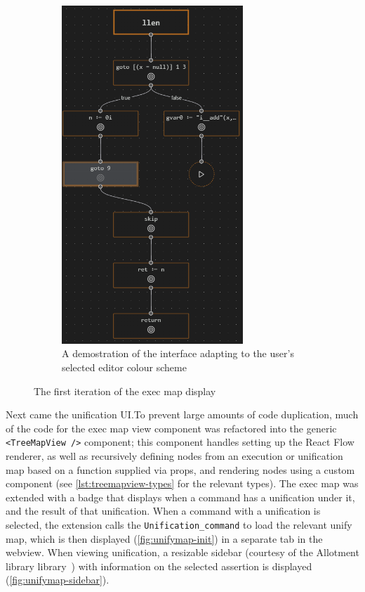 \begin{figure}
\begin{subfigure}[b]{0.4\textwidth}
    \includegraphics[width=0.75\textwidth]{img/execmap-theming.png}
    \caption{
      A demostration of the interface adapting to the user's selected editor
      colour scheme}%
    \label{fig:execmap-theming}
  \end{subfigure}
  \caption{The first iteration of the exec map display}
\end{figure}

Next came the unification UI.\@ To prevent large amounts of code duplication,
much of the code for the exec map view component was refactored into the generic
\texttt{<TreeMapView />} component; this component handles setting up the React
Flow renderer, as well as recursively defining nodes from an execution or
unification map based on a function supplied via props, and rendering nodes
using a custom component (see \autoref{lst:treemapview-types} for the relevant
types). The exec map was extended with a badge that displays when a command has
a unification under it, and the result of that unification. When a command with
a unification is selected, the extension calls the \texttt{Unification\_command}
to load the relevant unify map, which is then displayed
(\autoref{fig:unifymap-init}) in a separate tab in the webview. When viewing
unification, a resizable sidebar (courtesy of the Allotment library
library~\cite{allotment}) with information on the selected assertion
is displayed (\autoref{fig:unifymap-sidebar}).

